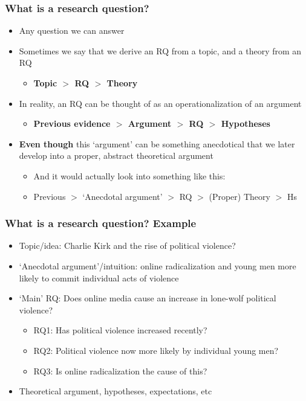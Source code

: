 \documentclass[aspectratio=43]{beamer}
\begin{document}

\begin{frame}
\frametitle{What is a research question?}
\centering

\begin{itemize}
  \item<1-> Any question we can answer
  \item<1-> Sometimes we say that we derive an RQ from a topic, and a theory from an RQ
  \begin{itemize}
    \item \textbf{Topic $>$ RQ $>$ Theory}
  \end{itemize}
  \item<2-> In reality, an RQ can be thought of as an operationalization of an argument
  \begin{itemize}
    \item \textbf{Previous evidence $>$ Argument $>$ RQ $>$ Hypotheses}
  \end{itemize}
  \item<2-> \textbf{Even though} this `argument' can be something anecdotical that we later develop into a proper, abstract theoretical argument
  \begin{itemize}
    \item<3-> And it would actually look into something like this:
    \item<3-> Previous $>$ `Anecdotal argument' $>$ RQ $>$ (Proper) Theory $>$ Hs
  \end{itemize}
\end{itemize}

\end{frame}

\begin{frame}
\frametitle{What is a research question? Example}
\centering

\begin{itemize}
  \item<1-> Topic/idea: Charlie Kirk and the rise of political violence?
  \item<2-> `Anecdotal argument'/intuition: online radicalization and young men more likely to commit individual acts of violence
  \item<3-> `Main' RQ: Does online media cause an increase in lone-wolf political violence?
  \begin{itemize}
    \item RQ1: Has political violence increased recently?
    \item RQ2: Political violence now more likely by individual young men?
    \item RQ3: Is online radicalization the cause of this?
  \end{itemize}
  \item<4-> Theoretical argument, hypotheses, expectations, etc
\end{itemize}

\end{frame}
\end{document}
